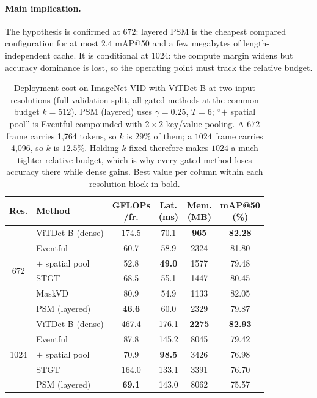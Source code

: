 \documentclass[letterpaper]{article}
\begin{document}
\paragraph{Main implication.}
The hypothesis is confirmed at $672$: layered PSM is the cheapest
compared configuration for at most $2.4$ mAP@50 and a few megabytes of
length-independent cache. It is conditional at $1024$: the compute
margin widens but accuracy dominance is lost, so the operating point
must track the relative budget.

\begin{table}[t]
\centering
\footnotesize
\setlength{\tabcolsep}{3pt}
\begin{tabular}{clcccc}
\toprule
Res. & Method & \makecell{GFLOPs\\/fr.} & \makecell{Lat.\\(ms)} & \makecell{Mem.\\(MB)} & \makecell{mAP@50\\(\%)} \\
\midrule
\multirow{6}{*}{672}
 & ViTDet-B (dense)     & 174.5 & 70.1 & \textbf{965}  & \textbf{82.28} \\
 & Eventful             & 60.7  & 58.9 & 2324 & 81.80 \\
 & \;\;$+$ spatial pool & 52.8  & \textbf{49.0} & 1577 & 79.48 \\
 & STGT                 & 68.5  & 55.1 & 1447 & 80.45 \\
 & MaskVD               & 80.9  & 54.9 & 1133 & 82.05 \\
 & PSM (layered)        & \textbf{46.6} & 60.0 & 2329 & 79.87 \\
\midrule
\multirow{5}{*}{1024}
 & ViTDet-B (dense)     & 467.4 & 176.1 & \textbf{2275} & \textbf{82.93} \\
 & Eventful             & 87.8  & 145.2 & 8045 & 79.42 \\
 & \;\;$+$ spatial pool & 70.9  & \textbf{98.5} & 3426 & 76.98 \\
 & STGT                 & 164.0 & 133.1 & 3391 & 76.70   \\
 & PSM (layered)        & \textbf{69.1} & 143.0 & 8062 & 75.57 \\
\bottomrule
\end{tabular}
\caption{Deployment cost on ImageNet VID with ViTDet-B at two input
resolutions (full validation split, all gated methods at the common
budget $k = 512$). PSM (layered) uses $\gamma = 0.25$, $T = 6$;
``$+$ spatial pool'' is Eventful compounded with $2{\times}2$ key/value
pooling. A $672$ frame carries 1{,}764 tokens, so $k$ is $29\%$ of them;
a $1024$ frame carries 4{,}096, so $k$ is $12.5\%$. Holding $k$ fixed therefore
makes $1024$ a much tighter relative budget, which is why every gated
method loses accuracy there while dense gains. Best value per column within each resolution block in
bold.}
\label{tab:vid}
\end{table}
\end{document}
